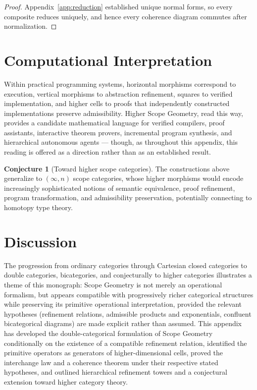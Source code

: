 \documentclass[11pt,twoside,openright]{book}
\numberwithin{equation}{chapter}
\theoremstyle{definition}
\theoremstyle{plain}
\theoremstyle{remark}
\theoremstyle{definition}
\newtheorem{conjecture}[definition]{Conjecture}
\begin{document}
\begin{proof}
Appendix~\ref{app:reduction} established unique normal forms, so every
composite reduces uniquely, and hence every coherence diagram commutes
after normalization.
\end{proof}

\section{Computational Interpretation}

Within practical programming systems, horizontal morphisms correspond to
execution, vertical morphisms to abstraction refinement, squares to
verified implementation, and higher cells to proofs that independently
constructed implementations preserve admissibility. Higher Scope Geometry,
read this way, provides a candidate mathematical language for verified
compilers, proof assistants, interactive theorem provers, incremental
program synthesis, and hierarchical autonomous agents --- though, as
throughout this appendix, this reading is offered as a direction rather
than as an established result.

\begin{conjecture}[Toward higher scope categories]
The constructions above generalize to $(\infty,n)$ scope categories,
whose higher morphisms would encode increasingly sophisticated notions of
semantic equivalence, proof refinement, program transformation, and
admissibility preservation, potentially connecting to homotopy type
theory.
\end{conjecture}

\section{Discussion}

The progression from ordinary categories through Cartesian closed
categories to double categories, bicategories, and conjecturally to
higher categories illustrates a theme of this monograph: Scope Geometry
is not merely an operational formalism, but appears compatible with
progressively richer categorical structures while preserving its
primitive operational interpretation, provided the relevant hypotheses
(refinement relations, admissible products and exponentials, confluent
bicategorical diagrams) are made explicit rather than assumed. This
appendix has developed the double-categorical formulation of Scope
Geometry conditionally on the existence of a compatible refinement
relation, identified the primitive operators as generators of
higher-dimensional cells, proved the interchange law and a coherence
theorem under their respective stated hypotheses, and outlined
hierarchical refinement towers and a conjectural extension toward higher
category theory.
\end{document}
